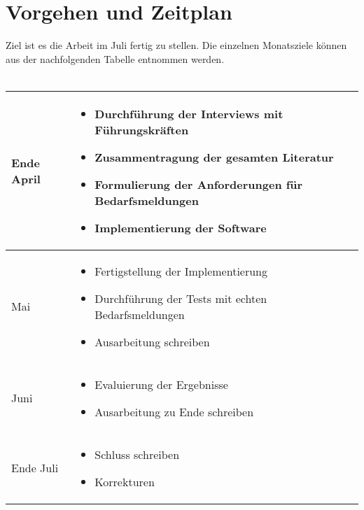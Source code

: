 \documentclass[a4paper,12pt]{scrreprt}
\newcommand{\hiddenchapter}[1]{
	\chapter*{{#1}}
}
\begin{document}
\hiddenchapter{Vorgehen und Zeitplan}
Ziel ist es die Arbeit im Juli fertig zu stellen. Die einzelnen Monatsziele können aus der nachfolgenden Tabelle entnommen werden. \\ \\
\begin{tabularx}{1\textwidth} { 
		| >{\raggedright\arraybackslash}X 
		| >{\raggedright\arraybackslash}X | }
	\hline
	Ende April
	& \begin{itemize}
		\item Durchführung der Interviews mit Führungskräften
		\item Zusammentragung der gesamten Literatur
		\item Formulierung der Anforderungen für Bedarfsmeldungen
		\item Implementierung der Software
	\end{itemize}\\
	\hline
	Mai
	& \begin{itemize}
		\item Fertigstellung der Implementierung
		\item Durchführung der Tests mit echten Bedarfsmeldungen
		\item Ausarbeitung schreiben
	\end{itemize}\\
	\hline
	Juni
	& \begin{itemize}
		\item Evaluierung der Ergebnisse
		\item Ausarbeitung zu Ende schreiben
	\end{itemize}\\
	\hline
	Ende Juli
	& \begin{itemize}
		\item Schluss schreiben
		\item Korrekturen
	\end{itemize}\\
	\hline
\end{tabularx}
\newpage

\renewcommand\contentsname{Aufbau der Arbeit}
\tableofcontents

\newpage
\end{document}
